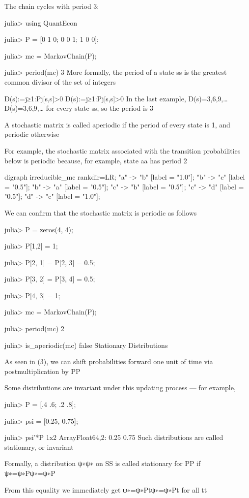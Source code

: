The chain cycles with period 3:

julia> using QuantEcon

julia> P = [0 1 0; 0 0 1; 1 0 0];

julia> mc = MarkovChain(P);

julia> period(mc)
3
More formally, the period of a state ss is the greatest common divisor of the set of integers

D(s):={j≥1:Pj[s,s]>0}
D(s):={j≥1:Pj[s,s]>0}
In the last example, D(s)={3,6,9,…}D(s)={3,6,9,…} for every state ss, so the period is 3

A stochastic matrix is called aperiodic if the period of every state is 1, and periodic otherwise

For example, the stochastic matrix associated with the transition probabilities below is periodic because, for example, state aa has period 2

digraph irreducible_mc { rankdir=LR; "a" -> "b" [label = "1.0"]; "b" -> "c" [label = "0.5"]; "b" -> "a" [label = "0.5"]; "c" -> "b" [label = "0.5"]; "c" -> "d" [label = "0.5"]; "d" -> "c" [label = "1.0"]; }

We can confirm that the stochastic matrix is periodic as follows

julia> P = zeros(4, 4);

julia> P[1,2] = 1;

julia> P[2, 1] = P[2, 3] = 0.5;

julia> P[3, 2] = P[3, 4] = 0.5;

julia> P[4, 3] = 1;

julia> mc = MarkovChain(P);

julia> period(mc)
2

julia> is_aperiodic(mc)
false
Stationary Distributions

As seen in (3), we can shift probabilities forward one unit of time via postmultiplication by PP

Some distributions are invariant under this updating process — for example,

julia> P = [.4 .6; .2 .8];

julia> psi = [0.25, 0.75];

julia> psi'*P
1x2 Array{Float64,2}:
 0.25  0.75
Such distributions are called stationary, or invariant

Formally, a distribution ψ∗ψ∗ on SS is called stationary for PP if ψ∗=ψ∗Pψ∗=ψ∗P

From this equality we immediately get ψ∗=ψ∗Ptψ∗=ψ∗Pt for all tt

